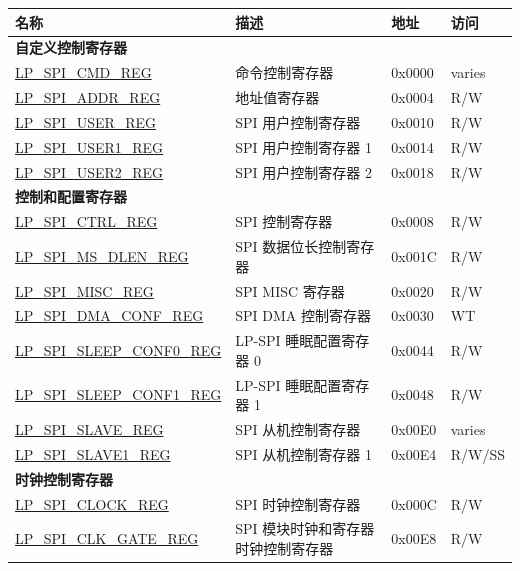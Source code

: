 \begin{longtable}{ | p{6cm} | p{6.6cm} | p{1.3cm} | p{1.7cm} | }

\hline\rowcolor{lightgray}
\textbf{名称} & \textbf{描述} &  \textbf{地址} & \textbf{访问} \\ \hline
\endhead
\multicolumn{4}{|l|}{\textbf{自定义控制寄存器}} \\ \hline
\hyperref[regdesc:LPSPICMDREG]{LP\_SPI\_CMD\_REG} & 命令控制寄存器 & 0x0000 & varies \\ \hline
\hyperref[regdesc:LPSPIADDRREG]{LP\_SPI\_ADDR\_REG} & 地址值寄存器 & 0x0004 & R/W \\ \hline
\hyperref[regdesc:LPSPIUSERREG]{LP\_SPI\_USER\_REG} & SPI 用户控制寄存器 & 0x0010 & R/W \\ \hline
\hyperref[regdesc:LPSPIUSER1REG]{LP\_SPI\_USER1\_REG} & SPI 用户控制寄存器 1 & 0x0014 & R/W \\ \hline
\hyperref[regdesc:LPSPIUSER2REG]{LP\_SPI\_USER2\_REG} & SPI 用户控制寄存器 2 & 0x0018 & R/W \\ \hline
\multicolumn{4}{|l|}{\textbf{控制和配置寄存器}} \\ \hline
\hyperref[regdesc:LPSPICTRLREG]{LP\_SPI\_CTRL\_REG} & SPI 控制寄存器 & 0x0008 & R/W \\ \hline
\hyperref[regdesc:LPSPIMSDLENREG]{LP\_SPI\_MS\_DLEN\_REG} & SPI 数据位长控制寄存器 & 0x001C & R/W \\ \hline
\hyperref[regdesc:LPSPIMISCREG]{LP\_SPI\_MISC\_REG} & SPI MISC 寄存器 & 0x0020 & R/W \\ \hline
\hyperref[regdesc:LPSPIDMACONFREG]{LP\_SPI\_DMA\_CONF\_REG} & SPI DMA 控制寄存器 & 0x0030 & WT \\ \hline
\hyperref[regdesc:LPSPISLEEPCONF0REG]{LP\_SPI\_SLEEP\_CONF0\_REG} & LP-SPI 睡眠配置寄存器 0 & 0x0044 & R/W \\ \hline
\hyperref[regdesc:LPSPISLEEPCONF1REG]{LP\_SPI\_SLEEP\_CONF1\_REG} & LP-SPI 睡眠配置寄存器 1 & 0x0048 & R/W \\ \hline
\hyperref[regdesc:LPSPISLAVEREG]{LP\_SPI\_SLAVE\_REG} & SPI 从机控制寄存器 & 0x00E0 & varies \\ \hline
\hyperref[regdesc:LPSPISLAVE1REG]{LP\_SPI\_SLAVE1\_REG} & SPI 从机控制寄存器 1 & 0x00E4 & R/W/SS \\ \hline
\multicolumn{4}{|l|}{\textbf{时钟控制寄存器}} \\ \hline
\hyperref[regdesc:LPSPICLOCKREG]{LP\_SPI\_CLOCK\_REG} & SPI 时钟控制寄存器 & 0x000C & R/W \\ \hline
\hyperref[regdesc:LPSPICLKGATEREG]{LP\_SPI\_CLK\_GATE\_REG} & SPI 模块时钟和寄存器时钟控制寄存器 & 0x00E8 & R/W \\ \hline

\end{longtable}
